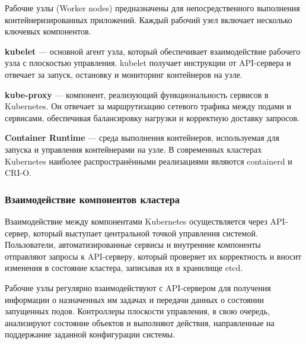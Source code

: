 Рабочие узлы (Worker nodes) предназначены для непосредственного выполнения контейнеризированных приложений. Каждый рабочий узел включает несколько ключевых компонентов.

\textbf{kubelet} — основной агент узла, который обеспечивает взаимодействие рабочего узла с плоскостью управления. kubelet получает инструкции от API-сервера и отвечает за запуск, остановку и мониторинг контейнеров на узле.

\textbf{kube-proxy} — компонент, реализующий функциональность сервисов в Kubernetes. Он отвечает за маршрутизацию сетевого трафика между подами и сервисами, обеспечивая балансировку нагрузки и корректную доставку запросов.

\textbf{Container Runtime} — среда выполнения контейнеров, используемая для запуска и управления контейнерами на узле. В современных кластерах Kubernetes наиболее распространёнными реализациями являются containerd и CRI-O.

\subsubsection{Взаимодействие компонентов кластера}

Взаимодействие между компонентами Kubernetes осуществляется через API-сервер, который выступает центральной точкой управления системой. Пользователи, автоматизированные сервисы и внутренние компоненты отправляют запросы к API-серверу, который проверяет их корректность и вносит изменения в состояние кластера, записывая их в хранилище etcd.

Рабочие узлы регулярно взаимодействуют с API-сервером для получения информации о назначенных им задачах и передачи данных о состоянии запущенных подов. Контроллеры плоскости управления, в свою очередь, анализируют состояние объектов и выполняют действия, направленные на поддержание заданной конфигурации системы.
